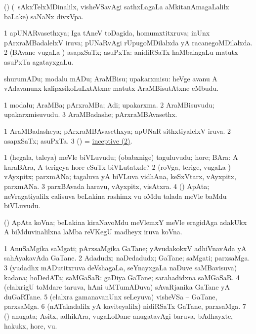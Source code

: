 \bentry
{}
\gl{\nA}
\bmng
(\birx) (\kanmu\ sAkxTelxMDinalilx, visheVSavAgi sathxLagaLa aMkitanAmagaLalilx baLake) saNaNx divxVpa. 
\emng
\eentry

\bentry
{}
\gl{\gu}
\bmng
\bnum
\num{1} apUNARvasethxya; Iga tAneV toDagida, homumxtitxruva; inUnx pArxraMBadalelxV iruva; pUNaRvAgi rUpugoMDilalxda yA racanegoMDilalxda. 
\num{2} (BAvane \mo vugaLa \vi) asapxSaTx; asuPxTa:  anidiRSaTx haMbalagaLu matutx asuPxTa agatayxgaLu. 
\enum
\emng
\eentry

\bentry
{}
\gl{\sakirx}
\bmng
shurumADu; modalu mADu; AraMBisu; upakarxmisu:  heVge avanu A vAdavanunx kalipxsikoLuLxtAtxne matutx AraMBisutAtxne eMbudu. 
\emng
\eentry

\bentry
{}
\gl{\nA}
\bmng
\bnum
\num{1} modalu; AraMBa; pArxraMBa; Adi; upakarxma. 
\num{2} AraMBisuvudu; upakarxmisuvudu. 
\num{3} AraMBadashe; pArxraMBAvasethx. 
\enum
\emng
\eentry

\bentry
{}
\gl{\gu}
\bmng
\bnum
\num{1} AraMBadasheya; pArxraMBAvasethxya; apUNaR sithxtiyalelxV iruva. 
\num{2} asapxSaTx; asuPxTa. 
\num{3} (\vAyx)  = \hyperlink{inceptive gu(2)}{inceptive (2)}. 
\enum
\emng
\eentry

\bentry
{}
\gl{\nA}
\bmng
\bnum
\num{1} (hegala, taleya) meVle biVLuvudu; (obabxnige) taguluvudu; hore; BAra:  A karaBAra, A terigeya hore eSuTx biVLutatxde? 
\num{2} (roVga, terige, \mo vugaLa \vi) vAyxpitx; parxmANa; tagaluva yA biVLuva vidhAna, keSxVtarx, vAyxpitx, parxmANa. 
\num{3} parxBAvada haravu, vAyxpitx, visAtxra. 
\num{4} (\Bwvi) ApAta; neVragatiyalilx calisuva beLakina rashimx \mo vu oMdu talada meVle baMdu biVLuvudu. 
\enum
\emng

\noindent
\gl{\pagu}
\bmng
{} (\Bwvi) ApAta koVna; beLakina kiraNavoMdu meVlemxY meVle eragidAga adakUkx A biMduvinalilxna laMba reVKegU madheyx iruva koVna. 
\emng
\eentry

\bentry
{}
\gl{\nA}
\bmng
\bnum
\num{1} AnuSaMgika saMgati; pArxsaMgika GaTane; yAvudakokxV adhiVnavAda yA sahAyakavAda GaTane. 
\num{2} Adadudx; naDedadudx; GaTane; saMgati; parxsaMga. 
\num{3} (yudadhx mADutitxruva deVshagaLa, seYnayxgaLa naDuve saMBavisuva) kadana; hoDedATa; saMGaSaR:  gaDiya GaTane; sarahadidxna saMGaSaR. 
\num{4} (elalxrigU toMdare taruva, hAni uMTumADuva) sAvaRjanika GaTane yA duGaRTane. 
\num{5} (elalxra gamanavanUnx seLeyuva) visheVSa -- GaTane, parxsaMga. 
\num{6} (nATakadalilx yA kaviteyalilx) nidiRSaTx GaTane, parxsaMga. 
\num{7} (\nAyxshA) anugata; Asitx, adhikAra, \mo vugaLoDane anugatavAgi baruva, bAdhayxte, hakukx, hore, \mo vu. 
\enum
\emng
\eentry

